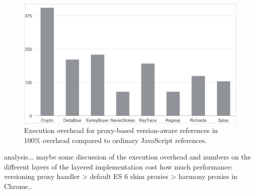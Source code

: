 \begin{figure}[h]
    \centering
    \includegraphics[width=\textwidth]{figures/executionOverhead.pdf}
    \caption{Execution overhead for proxy-based version-aware references in 100\% overhead compared to ordinary JavaScript references.}
    \label{fig:ExecutionOverhead}
\end{figure}



analysis...
maybe some discussion of the execution overhead and numbers on the different layers of the layered implementation cost how much performance: versioning proxy handler > default ES 6 shim proxies > harmony proxies in Chrome..



